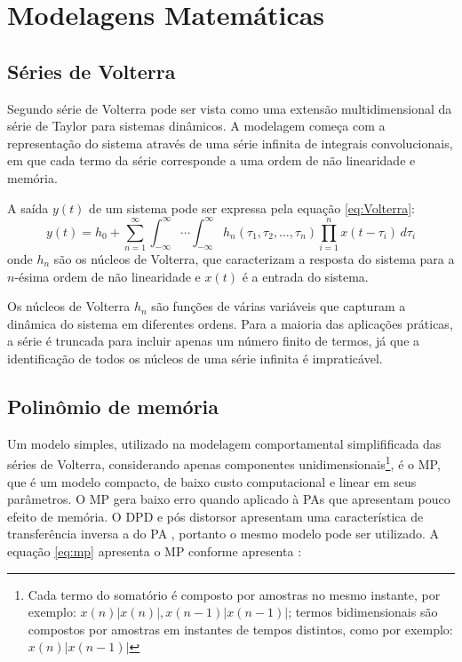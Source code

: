 \section{Modelagens Matemáticas}

\subsection*{Séries de Volterra}
Segundo \cite{Gonçalves2009} série de Volterra pode ser vista como uma extensão multidimensional da série de Taylor para sistemas dinâmicos. A modelagem começa com a representação do sistema através de uma série infinita de integrais convolucionais, em que cada termo da série corresponde a uma ordem de não linearidade e memória.

A saída \( y(t) \) de um sistema pode ser expressa pela equação \ref{eq:Volterra}: \begin{equation}
    y(t) = h_0 + \sum_{n=1}^{\infty} \int_{-\infty}^{\infty} \cdots \int_{-\infty}^{\infty} h_n(\tau_1, \tau_2, \ldots, \tau_n) \prod_{i=1}^{n} x(t - \tau_i) \, d\tau_i
    \label{eq:Volterra}
\end{equation} onde \( h_n \) são os núcleos de Volterra, que caracterizam a resposta do sistema para a \( n \)-ésima ordem de não linearidade e \( x(t) \) é a entrada do sistema.

Os núcleos de Volterra \( h_n \) são funções de várias variáveis que capturam a dinâmica do sistema em diferentes ordens. Para a maioria das aplicações práticas, a série é truncada para incluir apenas um número finito de termos, já que a identificação de todos os núcleos de uma série infinita é impraticável.

\subsection*{Polinômio de memória}\label{sub:polimem}

Um modelo simples, utilizado na modelagem comportamental simpliﬁficada das séries de Volterra, considerando apenas componentes unidimensionais\footnote{Cada termo do somatório é composto por amostras no mesmo instante, por exemplo: $x(n)|x(n)|,x(n - 1)|x(n - 1)|$; termos bidimensionais são compostos por amostras em instantes de tempos distintos, como por exemplo: $x(n)|x(n - 1)|$}, é o MP, que é um modelo compacto, de baixo custo computacional e linear em seus parâmetros. O MP gera baixo erro quando aplicado à PAs que apresentam pouco efeito de memória. O DPD e pós distorsor apresentam uma característica de transferência inversa a do PA \cite{Schuartz2017}, portanto o mesmo modelo pode ser utilizado. A equação \ref{eq:mp} apresenta o MP conforme apresenta \cite{Schuartz2017}: 


